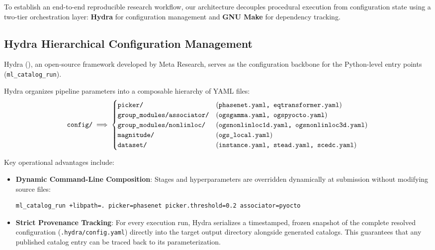 To establish an end-to-end reproducible research workflow, our architecture decouples procedural execution from configuration state using a two-tier orchestration layer: \textbf{Hydra} for configuration management and \textbf{GNU Make} for dependency tracking.

\subsection{Hydra Hierarchical Configuration Management}
Hydra (\cite{Hydra}), an open-source framework developed by Meta Research, serves as the configuration backbone for the Python-level entry points (\texttt{ml\_catalog\_run}).

Hydra organizes pipeline parameters into a composable hierarchy of YAML files:
\begin{equation}
  \text{\texttt{config/}} \implies \begin{cases}
    \text{\texttt{picker/}} & (\text{\texttt{phasenet.yaml, eqtransformer.yaml}}) \\
    \text{\texttt{group\_modules/associator/}} & (\text{\texttt{ogsgamma.yaml, ogspyocto.yaml}}) \\
    \text{\texttt{group\_modules/nonlinloc/}} & (\text{\texttt{ogsnonlinloc1d.yaml, ogsnonlinloc3d.yaml}}) \\
    \text{\texttt{magnitude/}} & (\text{\texttt{ogs\_local.yaml}}) \\
    \text{\texttt{dataset/}} & (\text{\texttt{instance.yaml, stead.yaml, scedc.yaml}})
  \end{cases}
\end{equation}

Key operational advantages include:
\begin{itemize}
  \item \textbf{Dynamic Command-Line Composition}: Stages and hyperparameters are overridden dynamically at submission without modifying source files:
  \begin{lstlisting}[language=bash,basicstyle=\scriptsize\ttfamily]
ml_catalog_run +libpath=. picker=phasenet picker.threshold=0.2 associator=pyocto
  \end{lstlisting}
  \item \textbf{Strict Provenance Tracking}: For every execution run, Hydra serializes a timestamped, frozen snapshot of the complete resolved configuration (\texttt{.hydra/config.yaml}) directly into the target output directory alongside generated catalogs. This guarantees that any published catalog entry can be traced back to its parameterization.
\end{itemize}

